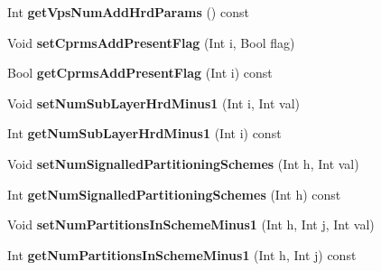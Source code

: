 \begin{DoxyCompactItemize}
Int {\bfseries get\+Vps\+Num\+Add\+Hrd\+Params} () const
\item 
\mbox{\label{class_t_com_vps_vui_bsp_hrd_parameters_a1f5409f78665597e1abd464baed45da2}} 
Void {\bfseries set\+Cprms\+Add\+Present\+Flag} (Int i, Bool flag)
\item 
\mbox{\label{class_t_com_vps_vui_bsp_hrd_parameters_a5cc1f8e8eb3802bbf4753a08ef0a21cf}} 
Bool {\bfseries get\+Cprms\+Add\+Present\+Flag} (Int i) const
\item 
\mbox{\label{class_t_com_vps_vui_bsp_hrd_parameters_a84a7a47b249d90a5424581d207dfbbb5}} 
Void {\bfseries set\+Num\+Sub\+Layer\+Hrd\+Minus1} (Int i, Int val)
\item 
\mbox{\label{class_t_com_vps_vui_bsp_hrd_parameters_a6ecc206f2f8b26fad6682c52ece77066}} 
Int {\bfseries get\+Num\+Sub\+Layer\+Hrd\+Minus1} (Int i) const
\item 
\mbox{\label{class_t_com_vps_vui_bsp_hrd_parameters_a031496ce4f4991342e9456c5408a91dc}} 
Void {\bfseries set\+Num\+Signalled\+Partitioning\+Schemes} (Int h, Int val)
\item 
\mbox{\label{class_t_com_vps_vui_bsp_hrd_parameters_aeb237f0d0e062b2012aedd0e4712307d}} 
Int {\bfseries get\+Num\+Signalled\+Partitioning\+Schemes} (Int h) const
\item 
\mbox{\label{class_t_com_vps_vui_bsp_hrd_parameters_a3c3155fb4731f5f4f5d960d389953bbd}} 
Void {\bfseries set\+Num\+Partitions\+In\+Scheme\+Minus1} (Int h, Int j, Int val)
\item 
\mbox{\label{class_t_com_vps_vui_bsp_hrd_parameters_aa7a4e07936f9f05064124f573bc9f47f}} 
Int {\bfseries get\+Num\+Partitions\+In\+Scheme\+Minus1} (Int h, Int j) const
\item 
\mbox{\label{class_t_com_vps_vui_bsp_hrd_parameters_a32fbbbbd8001eabd8f2ebab31988685a}} 

\end{DoxyCompactItemize}
